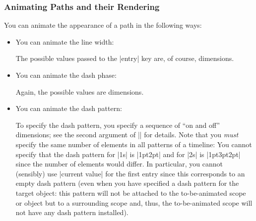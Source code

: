 \subsubsection{Animating Paths and their Rendering}
\label{section-base-animation-paths}

You can animate the appearance of a path in the following ways:

\begin{itemize}
\item You can animate the line width:
\begin{codeexample}[width=2.3cm]
\end{codeexample}
  The possible values passed to the |entry| key are, of course,
  dimensions. 
\item You can animate the dash phase:
\begin{codeexample}[width=2.3cm]
\end{codeexample}
  Again, the possible values are dimensions.
\item You can animate the dash pattern:
\begin{codeexample}[width=2.3cm]
\end{codeexample}
  To specify the dash pattern, you specify a sequence of ``on and
  off'' dimensions; see the second argument of |\pgfsetdash| for
  details. Note that you \emph{must} specify the same number of
  elements in all patterns of a timeline: You cannot specify that the
  dash pattern for |1s| is |{1pt}{2pt}| and for |2s| is
  |{1pt}{3pt}{2pt}| since the number of elements would differ. In
  particular, you cannot (sensibly) use |current value| for the first
  entry since this corresponds to an empty dash pattern (even when you
  have specified a dash pattern for the target object: this pattern
  will not be attached to the to-be-animated scope or object but to a
  surrounding scope and, thus, the to-be-animated scope will not have
  any dash pattern installed).

\end{itemize}
